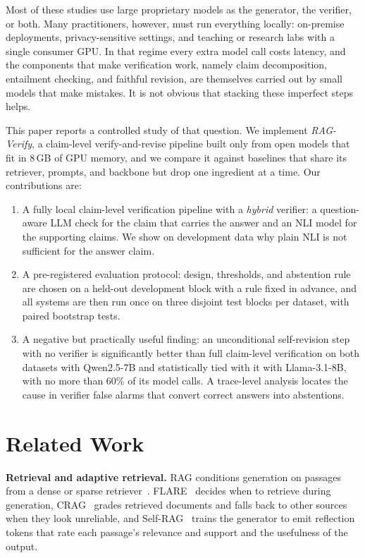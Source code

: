 \documentclass[conference]{IEEEtran}
\begin{document}
Most of these studies use large proprietary models as the generator, the verifier, or both. Many practitioners, however, must run everything locally: on-premise deployments, privacy-sensitive settings, and teaching or research labs with a single consumer GPU. In that regime every extra model call costs latency, and the components that make verification work, namely claim decomposition, entailment checking, and faithful revision, are themselves carried out by small models that make mistakes. It is not obvious that stacking these imperfect steps helps.

This paper reports a controlled study of that question. We implement \emph{RAG-Verify}, a claim-level verify-and-revise pipeline built only from open models that fit in 8\,GB of GPU memory, and we compare it against baselines that share its retriever, prompts, and backbone but drop one ingredient at a time. Our contributions are:
\begin{enumerate}
\item A fully local claim-level verification pipeline with a \emph{hybrid} verifier: a question-aware LLM check for the claim that carries the answer and an NLI model for the supporting claims. We show on development data why plain NLI is not sufficient for the answer claim.
\item A pre-registered evaluation protocol: design, thresholds, and abstention rule are chosen on a held-out development block with a rule fixed in advance, and all systems are then run once on three disjoint test blocks per dataset, with paired bootstrap tests.
\item A negative but practically useful finding: an unconditional self-revision step with no verifier is significantly better than full claim-level verification on both datasets with Qwen2.5-7B and statistically tied with it with Llama-3.1-8B, with no more than 60\% of its model calls. A trace-level analysis locates the cause in verifier false alarms that convert correct answers into abstentions.
\end{enumerate}

\section{Related Work}
\textbf{Retrieval and adaptive retrieval.} RAG conditions generation on passages from a dense or sparse retriever~\cite{lewis2020rag,gao2023ragsurvey}. FLARE~\cite{jiang2023flare} decides when to retrieve during generation, CRAG~\cite{yan2024crag} grades retrieved documents and falls back to other sources when they look unreliable, and Self-RAG~\cite{asai2023selfrag} trains the generator to emit reflection tokens that rate each passage's relevance and support and the usefulness of the output.
\end{document}
